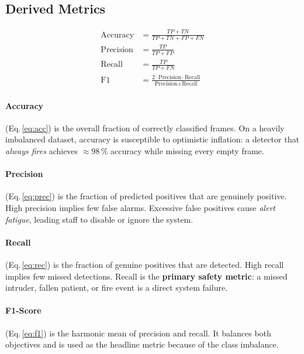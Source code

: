 \documentclass[11pt, a4paper]{article}
\begin{document}
\subsection{Derived Metrics}

\begin{align}
    \text{Accuracy}  &= \frac{TP + TN}{TP + TN + FP + FN} \label{eq:acc}  \\[6pt]
    \text{Precision} &= \frac{TP}{TP + FP}                \label{eq:prec} \\[6pt]
    \text{Recall}    &= \frac{TP}{TP + FN}                \label{eq:rec}  \\[6pt]
    \text{F1}        &= \frac{2 \cdot \text{Precision} \cdot \text{Recall}}
                              {\text{Precision} + \text{Recall}}            \label{eq:f1}
\end{align}

\paragraph{Accuracy} (Eq.\,\ref{eq:acc}) is the overall fraction of correctly classified
frames.  On a heavily imbalanced dataset, accuracy is susceptible to optimistic inflation:
a detector that \emph{always fires} achieves $\approx 98$\,\% accuracy while missing
every empty frame.

\paragraph{Precision} (Eq.\,\ref{eq:prec}) is the fraction of predicted positives that
are genuinely positive.  High precision implies few false alarms.  Excessive false
positives cause \emph{alert fatigue}, leading staff to disable or ignore the system.

\paragraph{Recall} (Eq.\,\ref{eq:rec}) is the fraction of genuine positives that are
detected.  High recall implies few missed detections.  Recall is the
\textbf{primary safety metric}: a missed intruder, fallen patient, or fire event is a
direct system failure.

\paragraph{F1-Score} (Eq.\,\ref{eq:f1}) is the harmonic mean of precision and recall.
It balances both objectives and is used as the headline metric because of the class
imbalance.
\end{document}

